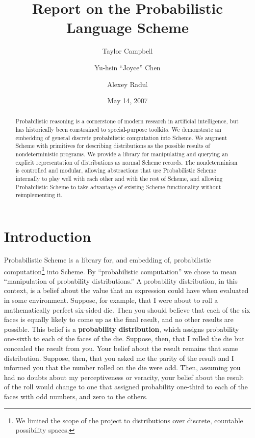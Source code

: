 \documentclass[12pt]{article}
\title{Report on the Probabilistic Language Scheme}
\author{Taylor Campbell \and Yu-hsin ``Joyce'' Chen \and Alexey Radul}
\date{May 14, 2007}
\newcommand{\defn}[1]{\textbf{#1}}
\begin{document}
\maketitle

\begin{abstract}
Probabilistic reasoning is a cornerstone of modern research in
artificial intelligence, but has historically been constrained to
special-purpose toolkits.  We demonstrate an embedding of general
discrete probabilistic computation into Scheme.  We augment Scheme
with primitives for describing distributions as the possible results
of nondeterministic programs.  We provide a library for manipulating
and querying an explicit representation of distributions as normal
Scheme records.  The nondeterminism is controlled and modular,
allowing abstractions that use Probabilistic Scheme internally to play
well with each other and with the rest of Scheme, and allowing
Probabilistic Scheme to take advantage of existing Scheme
functionality without reimplementing it.
\end{abstract}

\section{Introduction}
\label{introduction}

Probabilistic Scheme is a library for, and embedding of, probabilistic
computation\footnote{We limited the scope of the project to distributions over
discrete, countable possibility spaces.} into Scheme.
By ``probabilistic computation'' we chose to mean ``manipulation of
probability distributions.''  A probability distribution, in this
context, is a belief about the value that an expression could have
when evaluated in some environment.  Suppose, for example, that I were
about to roll a mathematically perfect six-sided die.  Then you should
believe that each of the six faces is equally likely to come up as the
final result, and no other results are possible.
This belief is a \defn{probability distribution}, which
assigns probability one-sixth to each of the faces of the die.
Suppose, then, that I rolled the die but concealed the result from
you.  Your belief about the result remains that same distribution.
Suppose, then, that you asked me the parity of the result and I
informed you that the number rolled on the die were odd.  Then,
assuming you had no doubts about my perceptiveness or veracity, your
belief about the result of the roll would change to one that assigned
probability one-third to each of the faces with odd numbers, and zero
to the others.
\end{document}
